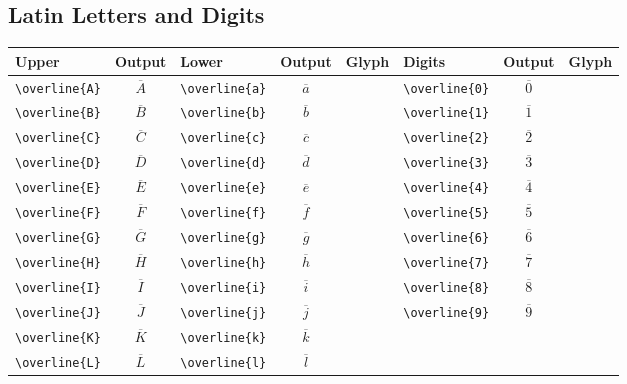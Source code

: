 \documentclass[12pt,a4paper]{article}
\begin{document}
\subsection*{Latin Letters and Digits}
\begin{longtable}{|l|c|l|c|c|l|c|c|}
\hline
\textbf{Upper}      & \textbf{Output} & \textbf{Lower}      & \textbf{Output} & \textbf{Glyph} & \textbf{Digits}     & \textbf{Output} & \textbf{Glyph} \\
\hline
\verb|\overline{A}| & $\overline{A}$  & \verb|\overline{a}| & $\overline{a}$  &                & \verb|\overline{0}| & $\overline{0}$  & \\
\verb|\overline{B}| & $\overline{B}$  & \verb|\overline{b}| & $\overline{b}$  &                & \verb|\overline{1}| & $\overline{1}$  & \\
\verb|\overline{C}| & $\overline{C}$  & \verb|\overline{c}| & $\overline{c}$  &                & \verb|\overline{2}| & $\overline{2}$  & \\
\verb|\overline{D}| & $\overline{D}$  & \verb|\overline{d}| & $\overline{d}$  &                & \verb|\overline{3}| & $\overline{3}$  & \\
\verb|\overline{E}| & $\overline{E}$  & \verb|\overline{e}| & $\overline{e}$  &                & \verb|\overline{4}| & $\overline{4}$  & \\
\verb|\overline{F}| & $\overline{F}$  & \verb|\overline{f}| & $\overline{f}$  &                & \verb|\overline{5}| & $\overline{5}$  & \\
\verb|\overline{G}| & $\overline{G}$  & \verb|\overline{g}| & $\overline{g}$  &                & \verb|\overline{6}| & $\overline{6}$  & \\
\verb|\overline{H}| & $\overline{H}$  & \verb|\overline{h}| & $\overline{h}$  &                & \verb|\overline{7}| & $\overline{7}$  & \\
\verb|\overline{I}| & $\overline{I}$  & \verb|\overline{i}| & $\overline{i}$  &                & \verb|\overline{8}| & $\overline{8}$  & \\
\verb|\overline{J}| & $\overline{J}$  & \verb|\overline{j}| & $\overline{j}$  &                & \verb|\overline{9}| & $\overline{9}$  & \\
\verb|\overline{K}| & $\overline{K}$  & \verb|\overline{k}| & $\overline{k}$  &                &                     &                 & \\
\verb|\overline{L}| & $\overline{L}$  & \verb|\overline{l}| & $\overline{l}$  &                &                     &                 & \\

\end{longtable}
\end{document}
